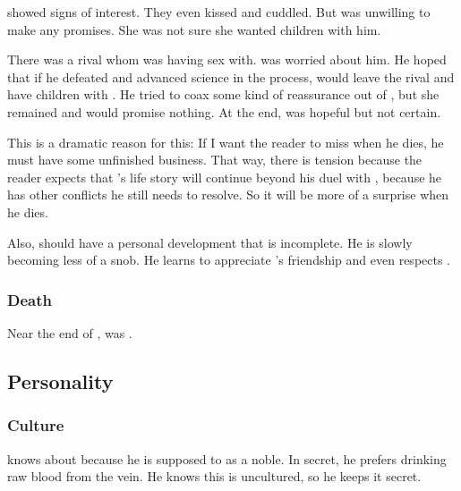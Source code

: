 \Firaxel showed signs of interest. 
They even kissed and cuddled. 
But \Firaxel was unwilling to make any promises.
She was not sure she wanted children with him. 

There was a rival whom \Firaxel was having sex with.
\Teshrial was worried about him.
He hoped that if he defeated \Ishnaruchaefir and advanced science in the process, \Firaxel would leave the rival and have children with \Teshrial.
He tried to coax some kind of reassurance out of \Firaxel, but she remained \blase and would promise nothing.
At the end, \Teshrial was hopeful but not certain. 

This is a dramatic reason for this:
If I want the reader to miss \Teshrial when he dies, he must have some unfinished business.
That way, there is tension because the reader expects that \Teshrial's life story will continue beyond his duel with \Ishnaruchaefir, because he has other conflicts he still needs to resolve. 
So it will be more of a surprise when he dies. 

Also, \Teshrial should have a personal development that is incomplete. 
He is slowly becoming less of a snob.
He learns to appreciate \Urizeth's friendship and even respects \Achsah. 





\subsubsection{Death}
Near the end of \emph{\TwilightAngelRemember{}}, \Teshrial{} was .









\subsection{Personality}





\subsubsection{Culture}
\Teshrial{} knows about  because he is supposed to as a noble. 
In secret, he prefers drinking raw blood from the vein. 
He knows this is uncultured, so he keeps it secret. 





